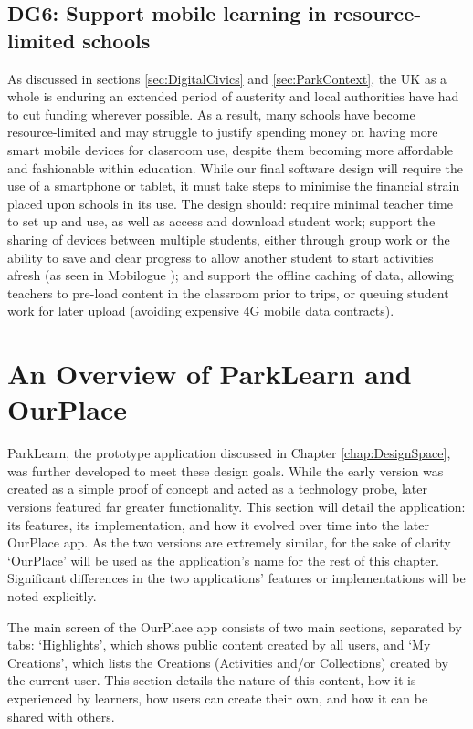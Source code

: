 \subsection*{ DG6: Support mobile learning in resource-limited schools }
\label{DG6}

As discussed in sections \ref{sec:DigitalCivics} and \ref{sec:ParkContext}, the UK as a whole is enduring an extended period of austerity and local authorities have had to cut funding wherever possible. As a result, many schools have become resource-limited and may struggle to justify spending money on having more smart mobile devices for classroom use, despite them becoming more affordable and fashionable within education. While our final software design will require the use of a smartphone or tablet, it must take steps to minimise the financial strain placed upon schools in its use. The design should: require minimal teacher time to set up and use, as well as access and download student work; support the sharing of devices between multiple students, either through group work or the ability to save and clear progress to allow another student to start activities afresh (as seen in Mobilogue \citep{Giemza2013}); and support the offline caching of data, allowing teachers to pre-load content in the classroom prior to trips, or queuing student work for later upload (avoiding expensive 4G mobile data contracts).

\section{An Overview of ParkLearn and OurPlace}

ParkLearn, the prototype application discussed in Chapter \ref{chap:DesignSpace}, was further developed to meet these design goals. While the early version was created as a simple proof of concept and acted as a technology probe, later versions featured far greater functionality. This section will detail the application: its features, its implementation, and how it evolved over time into the later OurPlace app. As the two versions are extremely similar, for the sake of clarity `OurPlace' will be used as the application's name for the rest of this chapter. Significant differences in the two applications' features or implementations will be noted explicitly.

The main screen of the OurPlace app consists of two main sections, separated by tabs: `Highlights', which shows public content created by all users, and `My Creations', which lists the Creations (Activities and/or Collections) created by the current user. This section details the nature of this content, how it is experienced by learners, how users can create their own, and how it can be shared with others.

